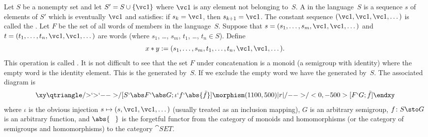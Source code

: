 \begin{exam} Let $S$ be a nonempty set and let $S' = S \cup \{\vc 1\}$ where $\vc 1$ is any
element not belonging to~$S$.  A
 in the language~$S$ is a sequence $s$ of elements of $S'$ which is eventually
$\vc 1$ and satisfies: if $s_k = \vc 1$, then $s_{k+1} = \vc 1$.  The constant sequence
$(\vc 1, \vc 1, \vc 1, \dots)$ is called the
. Let $F$ be the set of all words of members in the language~$S$. Suppose
that $s = (s_1, \dots, s_m, \vc 1, \vc 1, \dots)$ and $t = (t_1, \dots, t_n, \vc 1, \vc
1, \dots)$ are words (where $s_1$, \dots, $s_m$, $t_1$, \dots, $t_n \in S$).  Define
   \[ x \ast y := (s_1, \dots, s_m, t_1, \dots, t_n, \vc 1, \vc 1, \dots). \]
This operation is called
. It is not difficult to see that the set $F$ under concatenation is a
monoid (a semigroup with identity) where the empty word is the identity element.  This is the
 generated by~$S$.  If we exclude the empty word we have the
 generated by~$S$. The associated diagram is
 \[\xy
     \qtriangle/{>}`{>}`{-->}/[S`\abs F`\abs G;\iota`f`\abs{\tilde f}]
     \morphism(1100,500)|r|/{-->}/<0,-500>[F`G;\tilde f]
   \endxy\]
where $\iota$ is the obvious injection $s \mapsto (s,\vc1, \vc 1, \dots)$ (usually
treated as an inclusion mapping), $G$ is an arbitrary semigroup, $f\colon S \sto G$ is an
arbitrary function, and $\abs{\hphantom{O}}$ is the forgetful functor from the category of monoids and
homomorphisms (or the category of semigroups and homomorphisms) to the category
$\cat{SET}$.
\end{exam}

